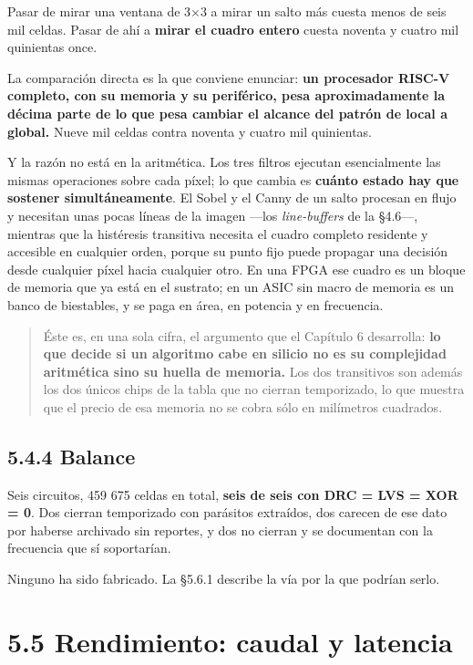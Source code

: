 Pasar de mirar una ventana de 3×3 a mirar un salto más cuesta menos de
seis mil celdas. Pasar de ahí a \textbf{mirar el cuadro entero} cuesta
noventa y cuatro mil quinientas once.

La comparación directa es la que conviene enunciar: \textbf{un
procesador RISC-V completo, con su memoria y su periférico, pesa
aproximadamente la décima parte de lo que pesa cambiar el alcance del
patrón de local a global.} Nueve mil celdas contra noventa y cuatro mil
quinientas.

Y la razón no está en la aritmética. Los tres filtros ejecutan
esencialmente las mismas operaciones sobre cada píxel; lo que cambia es
\textbf{cuánto estado hay que sostener simultáneamente}. El Sobel y el
Canny de un salto procesan en flujo y necesitan unas pocas líneas de la
imagen ---los \emph{line-buffers} de la §4.6---, mientras que la
histéresis transitiva necesita el cuadro completo residente y accesible
en cualquier orden, porque su punto fijo puede propagar una decisión
desde cualquier píxel hacia cualquier otro. En una FPGA ese cuadro es un
bloque de memoria que ya está en el sustrato; en un ASIC sin macro de
memoria es un banco de biestables, y se paga en área, en potencia y en
frecuencia.

\begin{quote}
Éste es, en una sola cifra, el argumento que el Capítulo 6 desarrolla:
\textbf{lo que decide si un algoritmo cabe en silicio no es su
complejidad aritmética sino su huella de memoria.} Los dos transitivos
son además los dos únicos chips de la tabla que no cierran temporizado,
lo que muestra que el precio de esa memoria no se cobra sólo en
milímetros cuadrados.
\end{quote}

\subsection{5.4.4 Balance}\label{balance}

Seis circuitos, 459 675 celdas en total, \textbf{seis de seis con DRC =
LVS = XOR = 0}. Dos cierran temporizado con parásitos extraídos, dos
carecen de ese dato por haberse archivado sin reportes, y dos no cierran
y se documentan con la frecuencia que sí soportarían.

Ninguno ha sido fabricado. La §5.6.1 describe la vía por la que podrían
serlo.

\section{5.5 Rendimiento: caudal y
latencia}\label{rendimiento-caudal-y-latencia}


